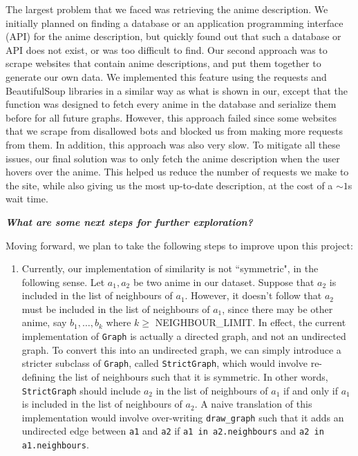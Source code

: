 \documentclass[12pt]{article}
\begin{document}
\begin{enumerate}
\begin{text}
The largest problem that we faced was retrieving the anime description. We initially planned on finding a database or an application programming interface (API) for the anime description, but quickly found out that such a database or API does not exist, or was too difficult to find. Our second approach was to scrape websites that contain anime descriptions, and put them together to generate our own data. We implemented this feature using the requests and BeautifulSoup libraries in a similar way as what is shown in our, except that the function was designed to fetch every anime in the database and serialize them before for all future graphs. However, this approach failed since some websites that we scrape from disallowed bots and blocked us from making more requests from them. In addition, this approach was also very slow. To mitigate all these issues, our final solution was to only fetch the anime description when the user hovers over the anime. This helped us reduce the number of requests we make to the site, while also giving us the most up-to-date description, at the cost of a $\sim1$s wait time.

\bigskip

\textbf{\textit{What are some next steps for further exploration?}}

Moving forward, we plan to take the following steps to improve upon this project:

\begin{enumerate}
    \item Currently, our implementation of similarity is not ``symmetric", in the following sense. Let $a_1, a_2$ be two anime in our dataset. Suppose that $a_2$ is included in the list of neighbours of $a_1$. However, it doesn't follow that $a_2$ must be included in the list of neighbours of $a_1$, since there may be other anime, say $b_1, \ldots, b_k$ where $k \geq$ NEIGHBOUR\_LIMIT. In effect, the current implementation of \texttt{Graph} is actually a directed graph, and not an undirected graph. To convert this into an undirected graph, we can simply introduce a stricter subclass of \texttt{Graph}, called \texttt{StrictGraph}, which would involve re-defining the list of neighbours such that it is symmetric. In other words, \texttt{StrictGraph} should include $a_2$ in the list of neighbours of $a_1$ if and only if $a_1$ is included in the list of neighbours of $a_2$. A naive translation of this implementation would involve over-writing \texttt{draw\_graph} such that it adds an undirected edge between \texttt{a1} and \texttt{a2} if \texttt{a1 in a2.neighbours} and \texttt{a2 in a1.neighbours}.
    

\end{enumerate}
\end{text}
\end{enumerate}
\end{document}
